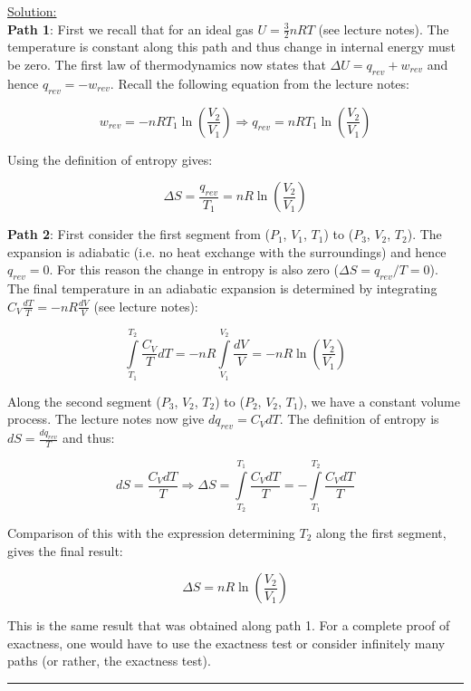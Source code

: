 \noindent
\underline{Solution:}\\

\textbf{Path 1}: First we recall that for an ideal gas $U = \frac{3}{2} nRT$ (see lecture notes). The temperature is constant along this path and thus change in internal energy must be zero. The first law of thermodynamics now states that $\Delta U = q_{rev} + w_{rev}$ and hence $q_{rev} = -w_{rev}$. Recall the following equation from the lecture notes:

$$w_{rev} = -nRT_1\ln\left(\frac{V_2}{V_1}\right) \Rightarrow q_{rev} = nRT_1\ln\left(\frac{V_2}{V_1}\right)$$

Using the definition of entropy gives:

$$\Delta S = \frac{q_{rev}}{T_1} = nR\ln\left(\frac{V_2}{V_1}\right)$$

\textbf{Path 2}: First consider the first segment from ($P_1$, $V_1$, $T_1$) to ($P_3$, $V_2$, $T_2$). The expansion is adiabatic (i.e. no heat exchange with the surroundings) and hence $q_{rev} = 0$. For this reason the change in entropy is also zero ($\Delta S = q_{rev} / T = 0$). The final temperature in an adiabatic expansion is determined by integrating $C_V\frac{dT}{T} = -nR\frac{dV}{V}$ (see lecture notes):

$$\int\limits_{T_1}^{T_2}\frac{C_V}{T}dT = -nR\int\limits_{V_1}^{V_2}\frac{dV}{V} = -nR\ln\left(\frac{V_2}{V_1}\right)$$

Along the second segment ($P_3$, $V_2$, $T_2$) to ($P_2$, $V_2$, $T_1$), we have a constant volume process. The lecture notes now give $dq_{rev} = C_VdT$. The definition of entropy is $dS = \frac{dq_{rev}}{T}$ and thus:

$$dS = \frac{C_VdT}{T} \Rightarrow \Delta S = \int\limits_{T_2}^{T_1}\frac{C_VdT}{T} = -\int\limits_{T_1}^{T_2}\frac{C_VdT}{T}$$

Comparison of this with the expression determining $T_2$ along the first segment, gives the final result:

$$\Delta S = nR\ln\left(\frac{V_2}{V_1}\right)$$

This is the same result that was obtained along path 1. For a complete proof of exactness, one would have to use the exactness test or consider infinitely many paths (or rather, the exactness test).

\hrule\vspace{0.5cm}
